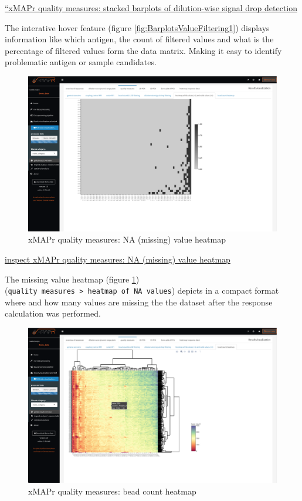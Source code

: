 \documentclass[
]{book}
\begin{document}
\href{figures/quality_measures__value_filtering_signal_drop.png}{``xMAPr quality measures: stacked barplots of dilution-wise signal drop detection}

The interative hover feature (figure \ref{fig:BarplotsValueFiltering1}) displays information like which antigen, the count of filtered values and what is the percentage of filtered values form the data matrix. Making it easy to identify problematic antigen or sample candidates.

\begin{figure}
\includegraphics[width=50.47in]{figures/quality_measures__NA_value_heatmap} \caption{xMAPr quality measures: NA (missing) value heatmap}\label{fig:heatmapNA}
\end{figure}

\href{figures/quality_measures__NA_value_heatmap.png}{inspect xMAPr quality measures: NA (missing) value heatmap}

The missing value heatmap (figure \ref{fig:heatmapNA}) (\texttt{quality\ measures\ \textgreater{}\ heatmap\ of\ NA\ values}) depicts in a compact format where and how many values are missing the the dataset after the response calculation was performed.

\begin{figure}
\includegraphics[width=50.5in]{figures/quality_measures__bead_count_heatmap} \caption{xMAPr quality measures: bead count heatmap}\label{fig:heatmapBeadCount}
\end{figure}
\end{document}
